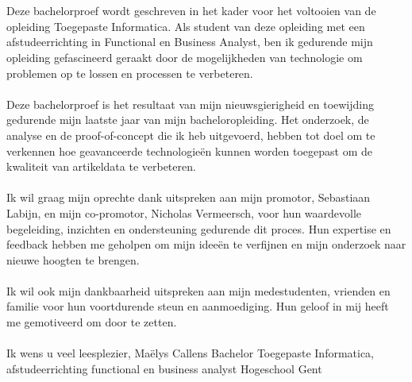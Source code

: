 
\chapter*{}%
\label{ch:voorwoord}


Deze bachelorproef wordt geschreven in het kader voor het voltooien van de opleiding Toegepaste Informatica. Als student van deze opleiding met een afstudeerrichting in Functional en Business Analyst, ben ik gedurende mijn opleiding gefascineerd geraakt door de mogelijkheden van technologie om problemen op te lossen en processen te verbeteren.
\\ \\
Deze bachelorproef is het resultaat van mijn nieuwsgierigheid en toewijding gedurende mijn laatste jaar van mijn bacheloropleiding. Het onderzoek, de analyse en de proof-of-concept die ik heb uitgevoerd, hebben tot doel om te verkennen hoe geavanceerde technologieën kunnen worden toegepast om de kwaliteit van artikeldata te verbeteren.
\\ \\
Ik wil graag mijn oprechte dank uitspreken aan mijn promotor, Sebastiaan Labijn, en mijn co-promotor, Nicholas Vermeersch, voor hun waardevolle begeleiding, inzichten en ondersteuning gedurende dit proces. Hun expertise en feedback hebben me geholpen om mijn ideeën te verfijnen en mijn onderzoek naar nieuwe hoogten te brengen.
\\ \\
Ik wil ook mijn dankbaarheid uitspreken aan mijn medestudenten, vrienden en familie voor hun voortdurende steun en aanmoediging. Hun geloof in mij heeft me gemotiveerd om door te zetten.
\\ \\ %
Ik wens u veel leesplezier,
\newline Maëlys Callens
\newline Bachelor Toegepaste Informatica, afstudeerrichting functional en business analyst
\newline Hogeschool Gent
